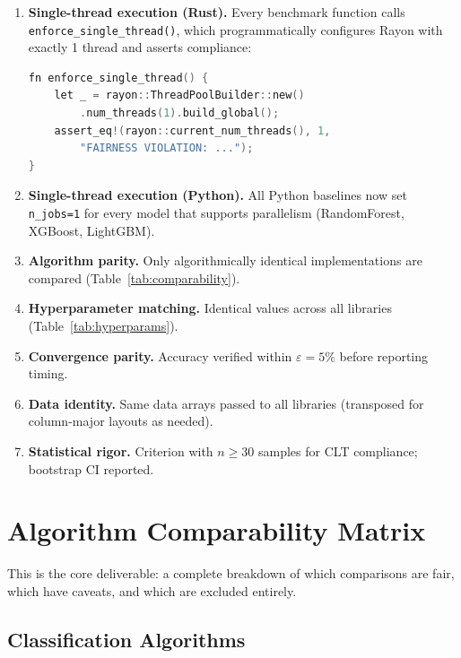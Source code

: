 \documentclass[11pt,a4paper]{article}
\begin{document}
\begin{enumerate}
    \item \textbf{Single-thread execution (Rust).} Every benchmark function
    calls \texttt{enforce\_single\_thread()}, which programmatically
    configures Rayon with exactly 1 thread and asserts compliance:
    \begin{lstlisting}[language=C,numbers=none]
fn enforce_single_thread() {
    let _ = rayon::ThreadPoolBuilder::new()
        .num_threads(1).build_global();
    assert_eq!(rayon::current_num_threads(), 1,
        "FAIRNESS VIOLATION: ...");
}
    \end{lstlisting}

    \item \textbf{Single-thread execution (Python).} All Python baselines
    now set \texttt{n\_jobs=1} for every model that supports parallelism
    (RandomForest, XGBoost, LightGBM).

    \item \textbf{Algorithm parity.} Only algorithmically identical
    implementations are compared (Table~\ref{tab:comparability}).

    \item \textbf{Hyperparameter matching.} Identical values across all
    libraries (Table~\ref{tab:hyperparams}).

    \item \textbf{Convergence parity.} Accuracy verified within
    $\varepsilon = 5\%$ before reporting timing.

    \item \textbf{Data identity.} Same data arrays passed to all
    libraries (transposed for column-major layouts as needed).

    \item \textbf{Statistical rigor.} Criterion with $n \geq 30$
    samples for CLT compliance; bootstrap CI reported.
\end{enumerate}

\section{Algorithm Comparability Matrix}
\label{sec:comparability}

This is the core deliverable: a complete breakdown of which comparisons
are fair, which have caveats, and which are excluded entirely.

\subsection{Classification Algorithms}
\end{document}
